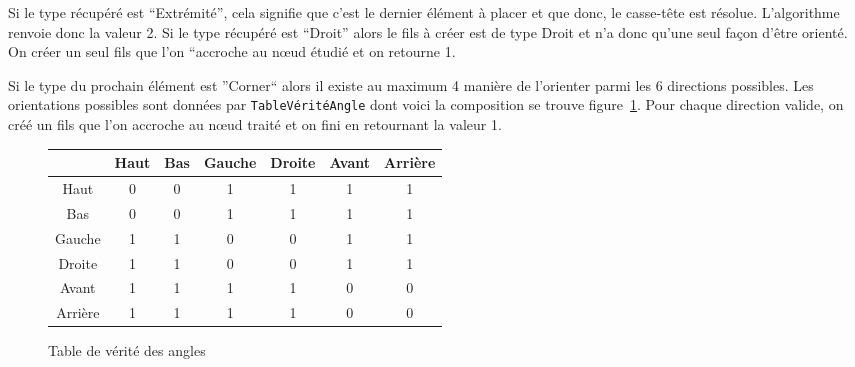 Si le type récupéré est ``Extrémité'', cela signifie que c'est le dernier élément à placer et que donc, le casse-tête est résolue. L'algorithme renvoie donc la valeur 2. Si le type récupéré est ``Droit'' alors le fils à créer est de type Droit et n'a donc qu'une seul façon d'être orienté. On créer un seul fils que l'on ``accroche au nœud étudié et on retourne 1.

Si le type du prochain élément est ''Corner`` alors il existe au maximum 4 manière de l'orienter parmi les 6 directions possibles. Les orientations possibles sont données par \verb|TableVéritéAngle| dont voici la composition se trouve figure~\ref{truthTable}. Pour chaque direction valide, on créé un fils que l'on accroche au nœud traité et on fini en retournant la valeur 1.

\begin{figure}
\begin{center}
\begin{tabular}{|*{7}{c|}}
\hline
~ & Haut & Bas & Gauche & Droite & Avant & Arrière \\
\hline
Haut & 0 & 0 & 1 & 1 & 1 & 1 \\
\hline
Bas & 0 & 0 & 1 & 1 & 1 & 1 \\
\hline
Gauche & 1 & 1 & 0 & 0 & 1 & 1 \\
\hline
Droite & 1 & 1 & 0 & 0 & 1 & 1 \\
\hline
Avant & 1 & 1 & 1 & 1 & 0 & 0 \\
\hline
Arrière & 1 & 1 & 1 & 1 & 0 & 0 \\
\hline
\end{tabular}
\end{center}
\caption{Table de vérité des angles}
\label{truthTable}
\end{figure}

